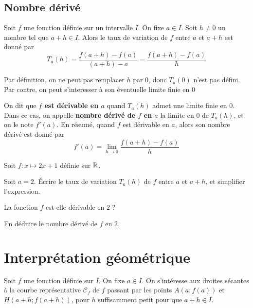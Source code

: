 \documentclass{poly}
\begin{document}
\subsection{Nombre dérivé}

\begin{tcolorbox}
Soit $f$ une fonction définie sur un intervalle $I$. On fixe $a \in I$. Soit $h \neq 0$ un nombre tel que $a + h \in I$. Alors le taux de variation de $f$ entre $a$ et $a + h$ est donné par
\begin{equation*}
T_a(h) = \dfrac{f(a + h) - f(a)}{(a + h) - a} = \dfrac{f(a + h) - f(a)}{h}
\end{equation*}
\end{tcolorbox}
\begin{remark}
Par définition, on ne peut pas remplacer $h$ par $0$, donc $T_a(0)$ n'est pas défini. Par contre, on peut s'interesser à son éventuelle limite finie en $0$
\end{remark}
\begin{tcolorbox}
\begin{definition}
On dit que \textbf{$f$ est dérivable en $a$} quand $T_a(h)$ admet une limite finie en $0$. Dans ce cas, on appelle \textbf{nombre dérivé de $f$ en $a$} la limite en $0$ de $T_a(h)$, et on le note $f'(a)$. En résumé, quand $f$ est dérivable en $a$, alors son nombre dérivé est donné par
\begin{equation*}
f'(a) = \lim_{h \to 0} \dfrac{f(a + h) - f(a)}{h}
\end{equation*}
\end{definition}
\end{tcolorbox}
\begin{example}
Soit $f : x \mapsto 2x + 1$ définie sur $\mathbb{R}$.
\begin{alphaquestions}
\item Soit $a = 2$. Écrire le taux de variation $T_a(h)$ de $f$ entre $a$ et $a + h$, et simplifier l'expression.
\item La fonction $f$ est-elle dérivable en $2$ ?
\item En déduire le nombre dérivé de $f$ en $2$.
\end{alphaquestions}

\end{example}

\newpage
\section{Interprétation géométrique}
Soit $f$ une fonction définie sur $I$. On fixe $a \in I$. On s'intéresse aux droites sécantes à la courbe représentative $\mathcal{C}_f$ de $f$ passant par les points $A(a;f(a))$ et $H(a+h;f(a+h))$, pour $h$ suffisamment petit pour que $a + h \in I$.
\end{document}
